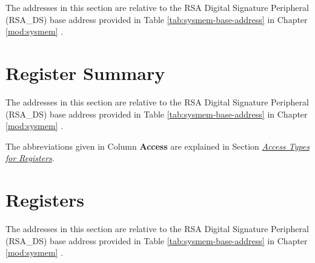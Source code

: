 \documentclass[main\_\_EN.tex]{subfiles}
\begin{document}
The addresses in this section are relative to the RSA Digital Signature Peripheral (RSA\_DS) base address provided in Table \ref{tab:sysmem-base-address} in Chapter \ref{mod:sysmem} \textit{}.






\clearpage
\hypertarget{digsig-reg-summ}{}
\section{Register Summary}
\label{sec:digsig-reg-summ}

The addresses in this section are relative to the RSA Digital Signature Peripheral (RSA\_DS) base address provided in Table \ref{tab:sysmem-base-address} in Chapter \ref{mod:sysmem} \textit{}.

The abbreviations given in Column \textbf{Access} are explained in Section \hyperref[glossary-access-types]{\textit{Access Types for Registers}}.






\clearpage
\section{Registers}

The addresses in this section are relative to the RSA Digital Signature Peripheral (RSA\_DS) base address provided in Table \ref{tab:sysmem-base-address} in Chapter \ref{mod:sysmem} \textit{}.


\end{document}
